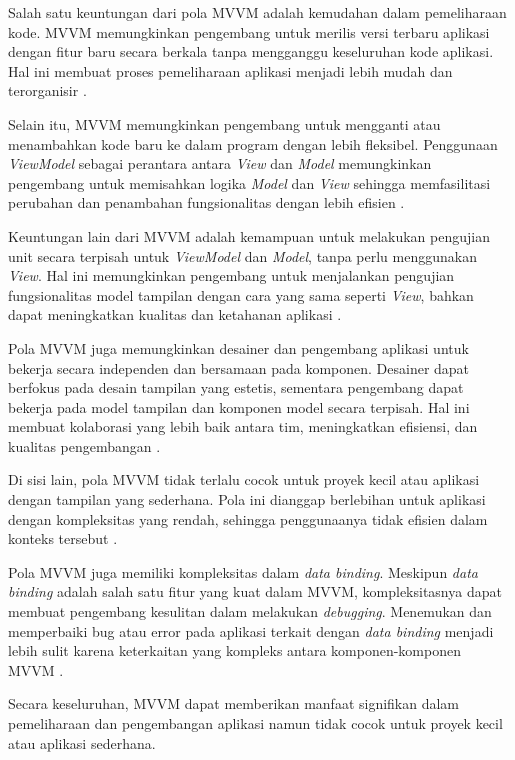 \documentclass[conference]{IEEEtran}
\begin{document}
    Salah satu keuntungan dari pola MVVM adalah kemudahan dalam pemeliharaan kode. MVVM memungkinkan pengembang untuk merilis versi terbaru aplikasi dengan fitur baru secara berkala tanpa mengganggu keseluruhan kode aplikasi. Hal ini membuat proses pemeliharaan aplikasi menjadi lebih mudah dan terorganisir \cite{Martin2024}.

    Selain itu, MVVM memungkinkan pengembang untuk mengganti atau menambahkan kode baru ke dalam program dengan lebih fleksibel. Penggunaan \textit{ViewModel} sebagai perantara antara \textit{View} dan \textit{Model} memungkinkan pengembang untuk memisahkan logika \textit{Model} dan \textit{View} sehingga memfasilitasi perubahan dan penambahan fungsionalitas dengan lebih efisien \cite{michael2023}.

    Keuntungan lain dari MVVM adalah kemampuan untuk melakukan pengujian unit secara terpisah untuk \textit{ViewModel} dan \textit{Model}, tanpa perlu menggunakan \textit{View}. Hal ini memungkinkan pengembang untuk menjalankan pengujian fungsionalitas model tampilan dengan cara yang sama seperti \textit{View}, bahkan dapat meningkatkan kualitas dan ketahanan aplikasi \cite{michael2023}.

    Pola MVVM juga memungkinkan desainer dan pengembang aplikasi untuk bekerja secara independen dan bersamaan pada komponen. Desainer dapat berfokus pada desain tampilan yang estetis, sementara pengembang dapat bekerja pada model tampilan dan komponen model secara terpisah. Hal ini membuat kolaborasi yang lebih baik antara tim, meningkatkan efisiensi, dan kualitas pengembangan \cite{michael2023}. 
 
    Di sisi lain, pola MVVM tidak terlalu cocok untuk proyek kecil atau aplikasi dengan tampilan yang sederhana. Pola ini dianggap berlebihan untuk aplikasi dengan kompleksitas yang rendah, sehingga penggunaanya tidak efisien dalam konteks tersebut \cite{Maulana2022}.

    Pola MVVM juga memiliki kompleksitas dalam \textit{data binding}. Meskipun \textit{data binding} adalah salah satu fitur yang kuat dalam MVVM, kompleksitasnya dapat membuat pengembang kesulitan dalam melakukan \textit{debugging}. Menemukan dan memperbaiki bug atau error pada aplikasi terkait dengan \textit{data binding} menjadi lebih sulit karena keterkaitan yang kompleks antara komponen-komponen MVVM \cite{Maulana2022}.

    Secara keseluruhan, MVVM dapat memberikan manfaat signifikan dalam pemeliharaan dan pengembangan aplikasi namun tidak cocok untuk proyek kecil atau aplikasi sederhana.
	
\end{document}
